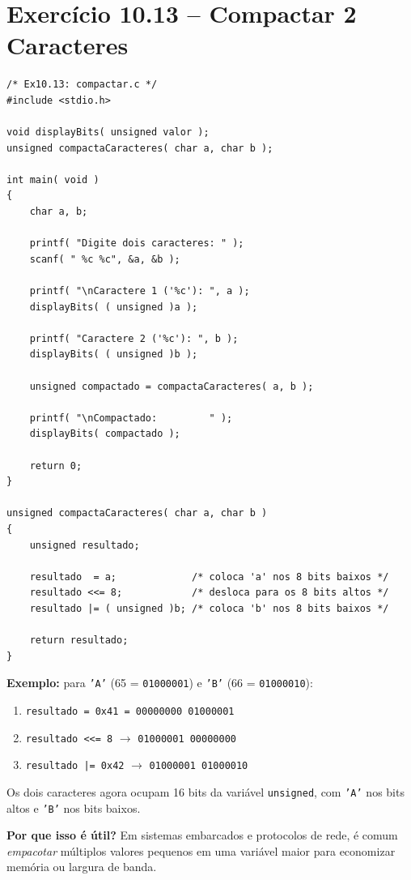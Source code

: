 \documentclass[12pt,a4paper]{article}
\begin{document}
\newpage

\section{Exercício 10.13 -- Compactar 2 Caracteres}

\begin{respostabox}
\begin{lstlisting}
/* Ex10.13: compactar.c */
#include <stdio.h>

void displayBits( unsigned valor );
unsigned compactaCaracteres( char a, char b );

int main( void )
{
    char a, b;

    printf( "Digite dois caracteres: " );
    scanf( " %c %c", &a, &b );

    printf( "\nCaractere 1 ('%c'): ", a );
    displayBits( ( unsigned )a );

    printf( "Caractere 2 ('%c'): ", b );
    displayBits( ( unsigned )b );

    unsigned compactado = compactaCaracteres( a, b );

    printf( "\nCompactado:         " );
    displayBits( compactado );

    return 0;
}

unsigned compactaCaracteres( char a, char b )
{
    unsigned resultado;

    resultado  = a;             /* coloca 'a' nos 8 bits baixos */
    resultado <<= 8;            /* desloca para os 8 bits altos */
    resultado |= ( unsigned )b; /* coloca 'b' nos 8 bits baixos */

    return resultado;
}
\end{lstlisting}

\textbf{Exemplo:} para \texttt{'A'} (65 = \texttt{01000001}) e \texttt{'B'}
(66 = \texttt{01000010}):
\begin{enumerate}[noitemsep]
  \item \texttt{resultado = 0x41 = 00000000 01000001}
  \item \texttt{resultado <<= 8} $\to$ \texttt{01000001 00000000}
  \item \texttt{resultado |= 0x42} $\to$ \texttt{01000001 01000010}
\end{enumerate}

Os dois caracteres agora ocupam 16 bits da variável \texttt{unsigned}, com \texttt{'A'}
nos bits altos e \texttt{'B'} nos bits baixos.

\textbf{Por que isso é útil?} Em sistemas embarcados e protocolos de rede, é comum
\textit{empacotar} múltiplos valores pequenos em uma variável maior para economizar
memória ou largura de banda.
\end{respostabox}
\end{document}
